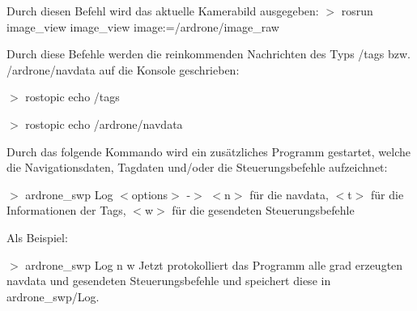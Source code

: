 Durch diesen Befehl wird das aktuelle Kamerabild ausgegeben: $>$ rosrun image\_\-view image\_\-view image:=/ardrone/image\_\-raw

Durch diese Befehle werden die reinkommenden Nachrichten des Typs /tags bzw. /ardrone/navdata auf die Konsole geschrieben:

$>$ rostopic echo /tags

$>$ rostopic echo /ardrone/navdata

Durch das folgende Kommando wird ein zusätzliches Programm gestartet, welche die Navigationsdaten, Tagdaten und/oder die Steuerungsbefehle aufzeichnet:

$>$ ardrone\_\-swp Log $<$options$>$ -\/$>$ $<$n$>$ für die navdata, $<$t$>$ für die Informationen der Tags, $<$w$>$ für die gesendeten Steuerungsbefehle

Als Beispiel:

$>$ ardrone\_\-swp Log n w Jetzt protokolliert das Programm alle grad erzeugten navdata und gesendeten Steuerungsbefehle und speichert diese in ardrone\_\-swp/Log. 